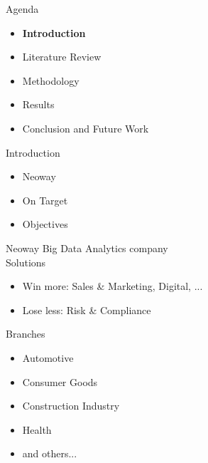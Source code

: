 \begin{frame}{Agenda}
\begin{itemize}
    \item \textbf{Introduction}
    \item Literature Review
    \item Methodology
    \item Results
    \item Conclusion and Future Work
\end{itemize}
\end{frame}


\begin{frame}{Introduction}
\begin{itemize}
    \item{Neoway\\}
    \vspace{0.5cm}
    \item{On Target\\}
    \vspace{0.5cm}
    \item{Objectives\\}
\end{itemize}
\end{frame}

%

\begin{frame}{Neoway}
    Big Data Analytics company\\ \pause
    \vspace{0.5cm}
    Solutions \pause
    \begin{itemize}
        \item Win more: Sales \& Marketing, Digital, ... \pause
        \item Lose less: Risk \& Compliance \pause
    \end{itemize}
    \vspace{0.5cm}
    Branches \pause
    \begin{itemize}
        \item Automotive \pause
        \item Consumer Goods \pause
        \item Construction Industry \pause
        \item Health \pause
        \item and others...
    \end{itemize} 
\end{frame}


